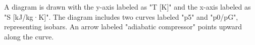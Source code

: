 A diagram is drawn with the y-axis labeled as "T [K]" and the x-axis labeled as "S [kJ/kg·K]". The diagram includes two curves labeled "p5" and "p0/pG", representing isobars. An arrow labeled "adiabatic compressor" points upward along the curve.